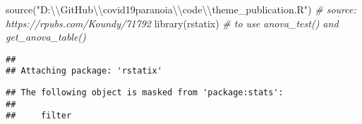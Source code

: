 \documentclass[
]{article}
\newenvironment{Shaded}{\begin{snugshade}}{\end{snugshade}}
\newcommand{\CommentTok}[1]{\textcolor[rgb]{0.56,0.35,0.01}{\textit{#1}}}
\newcommand{\FunctionTok}[1]{\textcolor[rgb]{0.00,0.00,0.00}{#1}}
\newcommand{\NormalTok}[1]{#1}
\newcommand{\SpecialCharTok}[1]{\textcolor[rgb]{0.00,0.00,0.00}{#1}}
\newcommand{\StringTok}[1]{\textcolor[rgb]{0.31,0.60,0.02}{#1}}
\begin{document}
\begin{Shaded}
\begin{Highlighting}[]
\FunctionTok{source}\NormalTok{(}\StringTok{"D:}\SpecialCharTok{\textbackslash{}\textbackslash{}}\StringTok{GitHub}\SpecialCharTok{\textbackslash{}\textbackslash{}}\StringTok{covid19paranoia}\SpecialCharTok{\textbackslash{}\textbackslash{}}\StringTok{code}\SpecialCharTok{\textbackslash{}\textbackslash{}}\StringTok{theme\_publication.R"}\NormalTok{) }\CommentTok{\# source: https://rpubs.com/Koundy/71792}
\FunctionTok{library}\NormalTok{(rstatix) }\CommentTok{\# to use anova\_test() and get\_anova\_table()}
\end{Highlighting}
\end{Shaded}

\begin{verbatim}
## 
## Attaching package: 'rstatix'
\end{verbatim}

\begin{verbatim}
## The following object is masked from 'package:stats':
## 
##     filter
\end{verbatim}
\end{document}

